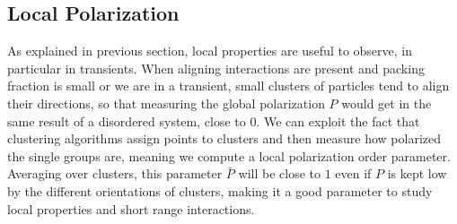 \documentclass[../../master_thesis_np.tex]{subfiles}
\begin{document}
		\subsection{Local Polarization}
		As explained in previous section, local properties are useful to observe, in particular in transients. When aligning interactions are present and packing fraction is small or we are in a transient, small clusters of particles tend to align their directions, so that measuring the global polarization $P$ would get in the same result of a disordered system, close to $0$. We can exploit the fact that clustering algorithms assign points to clusters and then measure how polarized the single groups are, meaning we compute a local polarization order parameter. Averaging over clusters, this parameter $\bar{P}$ will be close to $1$ even if $P$ is kept low by the different orientations of clusters, making it a good parameter to study local properties and short range interactions.
\end{document}
